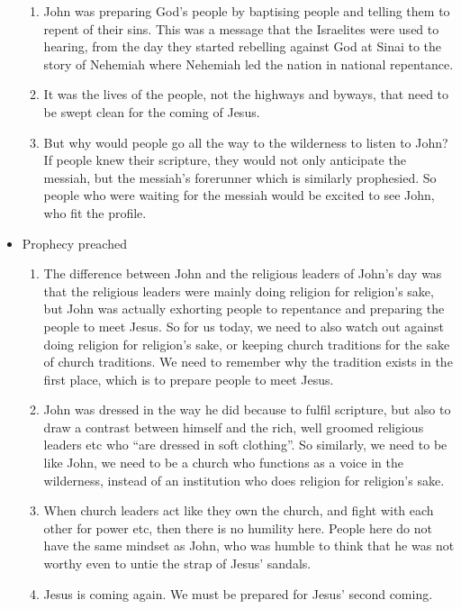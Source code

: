 \begin{itemize}
{\begin{enumerate}
    \item{John was preparing God’s people by baptising people and telling them to repent of their sins. This was a message that the Israelites were used to hearing, from the day they started rebelling against God at Sinai to the story of Nehemiah where Nehemiah led the nation in national repentance.}
    \item{It was the lives of the people, not the highways and byways, that need to be swept clean for the coming of Jesus.}
    \item{But why would people go all the way to the wilderness to listen to John? If people knew their scripture, they would not only anticipate the messiah, but the messiah’s forerunner which is similarly prophesied. So people who were waiting for the messiah would be excited to see John, who fit the profile.}
  \end{enumerate}}
  \item{Prophecy preached
  \begin{enumerate}
    \item{The difference between John and the religious leaders of John’s day was that the religious leaders were mainly doing religion for religion’s sake, but John was actually exhorting people to repentance and preparing the people to meet Jesus. So for us today, we need to also watch out against doing religion for religion’s sake, or keeping church traditions for the sake of church traditions. We need to remember why the tradition exists in the first place, which is to prepare people to meet Jesus.}
    \item{John was dressed in the way he did because to fulfil scripture, but also to draw a contrast between himself and the rich, well groomed religious leaders etc who “are dressed in soft clothing”. So similarly, we need to be like John, we need to be a church who functions as a voice in the wilderness, instead of an institution who does religion for religion’s sake.}
    \item{When church leaders act like they own the church, and fight with each other for power etc, then there is no humility here. People here do not have the same mindset as John, who was humble to think that he was not worthy even to untie the strap of Jesus’ sandals. }
    \item{Jesus is coming again. We must be prepared for Jesus’ second coming.}
  \end{enumerate}
  }
\end{itemize}